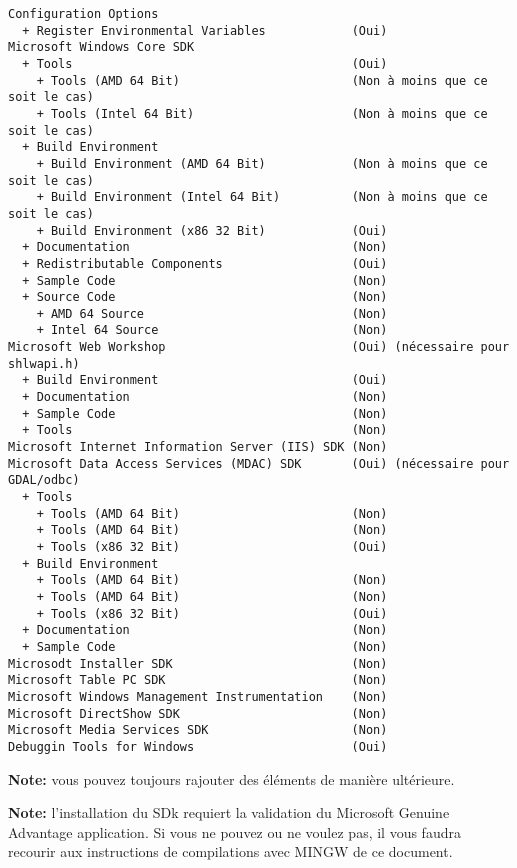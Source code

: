 \begin{verbatim}
Configuration Options
  + Register Environmental Variables            (Oui)
Microsoft Windows Core SDK
  + Tools                                       (Oui)
    + Tools (AMD 64 Bit)                        (Non à moins que ce soit le cas)
    + Tools (Intel 64 Bit)                      (Non à moins que ce soit le cas)
  + Build Environment
    + Build Environment (AMD 64 Bit)            (Non à moins que ce soit le cas)
    + Build Environment (Intel 64 Bit)          (Non à moins que ce soit le cas)
    + Build Environment (x86 32 Bit)            (Oui)
  + Documentation                               (Non)
  + Redistributable Components                  (Oui)
  + Sample Code                                 (Non)
  + Source Code                                 (Non)
    + AMD 64 Source                             (Non)
    + Intel 64 Source                           (Non)
Microsoft Web Workshop                          (Oui) (nécessaire pour shlwapi.h)
  + Build Environment                           (Oui)
  + Documentation                               (Non)
  + Sample Code                                 (Non)
  + Tools                                       (Non)
Microsoft Internet Information Server (IIS) SDK (Non)
Microsoft Data Access Services (MDAC) SDK       (Oui) (nécessaire pour GDAL/odbc)
  + Tools
    + Tools (AMD 64 Bit)                        (Non)
    + Tools (AMD 64 Bit)                        (Non)
    + Tools (x86 32 Bit)                        (Oui)
  + Build Environment
    + Tools (AMD 64 Bit)                        (Non)
    + Tools (AMD 64 Bit)                        (Non)
    + Tools (x86 32 Bit)                        (Oui)
  + Documentation                               (Non)
  + Sample Code                                 (Non)
Microsodt Installer SDK                         (Non)
Microsoft Table PC SDK                          (Non)
Microsoft Windows Management Instrumentation    (Non)
Microsoft DirectShow SDK                        (Non)
Microsoft Media Services SDK                    (Non)
Debuggin Tools for Windows                      (Oui)
\end{verbatim}

\textbf{Note:} vous pouvez toujours rajouter des éléments de manière ultérieure.

\textbf{Note:} l'installation du SDk requiert la validation du Microsoft Genuine Advantage application. Si vous ne pouvez ou ne voulez pas, il vous faudra recourir aux instructions de compilations avec MINGW  de ce document.

